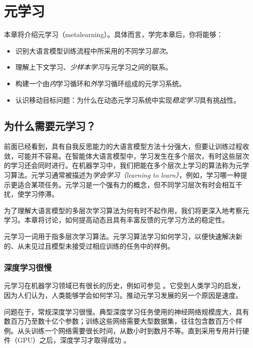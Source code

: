 \chapter{元学习}\label{chap:meta}

\begin{learningbox}
本章将介绍元学习（metalearning）。具体而言，学完本章后，你将能够：
\begin{itemize}[leftmargin=*, nosep]
    \item 识别大语言模型训练流程中所采用的不同学习{\em 层次}。

    \item 理解上下文学习、{\em 少样本学习}与元学习之间的联系。

    \item 构建一个由{\em 内}学习循环和{\em 外}学习循环组成的元学习系统。

    \item 认识移动目标问题：为什么在动态元学习系统中实现{\em 稳定学习}具有挑战性。

\end{itemize}
\end{learningbox}

\section{为什么需要元学习？}
前面已经看到，具有自我反思能力的大语言模型方法十分强大，但要让训练过程收敛，可能并不容易。在智能体大语言模型中，学习发生在多个层次，有时这些层次的学习还会同时进行。在机器学习中，我们把能在多个层次上学习的算法称为元学习算法。元学习通常被描述为{\em 学会学习（learning to learn）}，例如，学习哪一种提示更适合某项任务。元学习是一个强有力的概念，但不同学习层次有时会相互干扰，使学习停滞。

为了理解大语言模型的多层次学习算法为何有时不起作用，我们将更深入地考察元学习。本章将讨论，如何提高动态且具有丰富反馈的元学习方法的稳定性。

元学习一词用于指多层次学习算法。元学习算法学习如何学习，以便快速解决新的、从未见过且模型未接受过相应训练的任务中的样例。

\subsection{深度学习很慢}
元学习在机器学习领域已有很长的历史，例如可参见 \citet{schmidhuber1987evolutionary,hospedales2021meta,huisman2021survey}。它受到人类学习的启发，因为人们认为，人类能够学会如何学习。推动元学习发展的另一个原因是速度。

问题在于，常规深度学习很慢。典型深度学习任务使用的神经网络规模庞大，具有数百万乃至数十亿个参数；训练这些网络需要大型数据集，往往包含数百万个样例。从头训练一个网络需要很长时间，从数小时到数月不等。直到采用专用并行硬件（GPU）之后，深度学习才取得成功 \citep{krizhevsky2012imagenet}。

